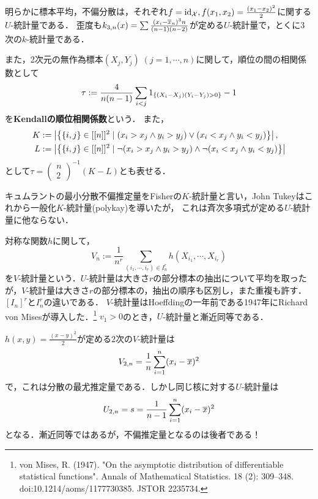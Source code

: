 \documentclass[uplatex,dvipdfmx]{jsreport}
\begin{document}
\begin{example}
    明らかに標本平均，不偏分散は，それぞれ$f=\mathrm{id}_{\mathcal{X}},f(x_1,x_2)=\frac{(x_1-x_2)^2}{2}$に関する$U$-統計量である．
    歪度も$k_{3,n}(x)=\sum\frac{(x_i-\overline{x}_n)^3n}{(n-1)(n-2)}$が定める$U$-統計量で，とくに3次の$k$-統計量である．

    また，2次元の無作為標本$(X_j,Y_j)\;(j=1,\cdots,n)$に関して，順位の間の相関係数として
    \[\tau:=\frac{4}{n(n-1)}\sum_{i<j}1_{\left\{(X_i-X_j)(Y_i-Y_j)>0\right\}}-1\]
    を\textbf{Kendallの順位相関係数}という．
    また，
    \begin{align*}
        K&:=\left|\left\{\{i,j\}\in[[n]]^2\mid (x_i>x_j\land y_i>y_j)\lor(x_i<x_j\land y_i<y_j)\right\}\right|,\\L&:=\left|\left\{\{i,j\}\in[[n]]^2\mid\lnot(x_i>x_j\land y_i>y_j)\land\lnot(x_i<x_j\land y_i<y_j)\right\}\right|
    \end{align*}
    として$\tau=\begin{pmatrix}n\\2\end{pmatrix}^{-1}(K-L)$とも表せる．
\end{example}

\begin{example}[K-statistic]
    キュムラントの最小分散不偏推定量をFisherの$K$-統計量と言い，John Tukeyはこれから一般化$K$-統計量(polykay)を導いたが，
    これは斉次多項式が定める$U$-統計量に他ならない．
\end{example}

\begin{example}[V-statistic]
    対称な関数$h$に関して，
    \[V_n:=\frac{1}{n^r}\sum_{(i_1,\cdots,i_r)\in I_n^r}h(X_{i_1},\cdots,X_{i_r})\]
    を$V$-統計量という．$U$-統計量は大きさ$r$の部分標本の抽出について平均を取ったが，$V$-統計量は大きさ$r$の部分標本の，抽出の順序も区別し，また重複も許す．$[I_n]^r$と$I_n^r$の違いである．
    $V$-統計量はHoeffdingの一年前である1947年にRichard von Misesが導入した．\footnote{von Mises, R. (1947). "On the asymptotic distribution of differentiable statistical functions". Annals of Mathematical Statistics. 18 (2): 309–348. doi:10.1214/aoms/1177730385. JSTOR 2235734.}
    $v_1>0$のとき，$U$-統計量と漸近同等である．

    $h(x,y)=\frac{(x-y)^2}{2}$が定める2次の$V$-統計量は
    \[V_{2,n}=\frac{1}{n}\sum^n_{i=1}(x_i-\overline{x})^2\]
    で，これは分散の最尤推定量である．しかし同じ核に対する$U$-統計量は
    \[U_{2,n}=s=\frac{1}{n-1}\sum^n_{i=1}(x_i-\overline{x})^2\]
    となる．漸近同等ではあるが，不偏推定量となるのは後者である！
\end{example}
\end{document}
